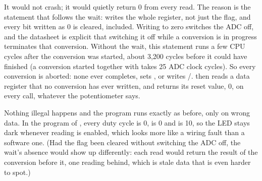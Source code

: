 It would not crash; it would quietly return 0 from every read. The reason is the statement that
follows the wait:  writes the whole register, not just the flag, and
every bit written as 0 is cleared,  included. Writing  to zero switches the
ADC off, and the datasheet is explicit that switching it off while a conversion is in progress
terminates that conversion. Without the wait, this statement runs a few CPU cycles after the
conversion was started, about 3,200 cycles before it could have finished (a conversion started
together with  takes 25 ADC clock cycles). So every conversion is aborted: none ever
completes, sets , or writes /.  then reads a data
register that no conversion has ever written, and returns its reset value, 0, on every call,
whatever the potentiometer says.

Nothing illegal happens and the program runs exactly as before, only on wrong data. In the program
of , every duty cycle is 0,  is 0 and  is 10, so the LED
stays dark whenever reading is enabled, which looks more like a wiring fault than a software one.
(Had the flag been cleared without switching the ADC off, the wait's absence would show up
differently: each read would return the result of the conversion before it, one reading behind,
which is stale data that is even harder to spot.)
